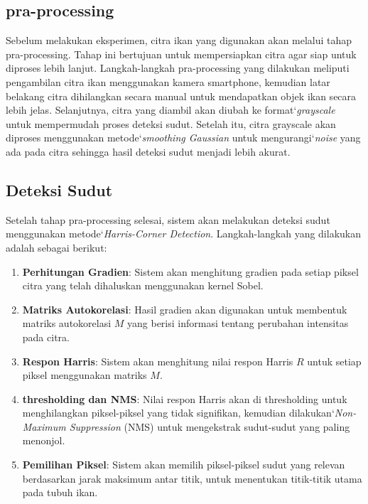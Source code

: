 \subsection{pra-processing}
    Sebelum melakukan eksperimen, citra ikan yang digunakan akan melalui tahap pra-processing. 
Tahap ini bertujuan untuk mempersiapkan citra agar siap untuk diproses lebih lanjut. 
Langkah-langkah pra-processing yang dilakukan meliputi pengambilan citra ikan menggunakan kamera smartphone, kemudian latar belakang citra dihilangkan secara manual untuk mendapatkan objek ikan secara lebih jelas. 
Selanjutnya, citra yang diambil akan diubah ke format`\emph{grayscale} untuk mempermudah proses deteksi sudut. 
Setelah itu, citra grayscale akan diproses menggunakan metode`\emph{smoothing Gaussian} untuk mengurangi`\emph{noise} yang ada pada citra sehingga hasil deteksi sudut menjadi lebih akurat.

\subsection{Deteksi Sudut}
    Setelah tahap pra-processing selesai, sistem akan melakukan deteksi sudut menggunakan metode`\emph{Harris-Corner Detection}. Langkah-langkah yang dilakukan adalah sebagai berikut: 
    \begin{enumerate}
            \item \textbf{Perhitungan Gradien}: Sistem akan menghitung gradien pada setiap piksel citra yang telah dihaluskan menggunakan kernel Sobel.
            \item \textbf{Matriks Autokorelasi}: Hasil gradien akan digunakan untuk membentuk matriks autokorelasi \(M\) yang berisi informasi tentang perubahan intensitas pada citra.
            \item \textbf{Respon Harris}: Sistem akan menghitung nilai respon Harris \(R\) untuk setiap piksel menggunakan matriks \(M\).
            \item \textbf{thresholding dan NMS}: Nilai respon Harris akan di thresholding untuk menghilangkan piksel-piksel yang tidak signifikan, kemudian dilakukan`\emph{Non-Maximum Suppression} (NMS) untuk mengekstrak sudut-sudut yang paling menonjol.
            \item \textbf{Pemilihan Piksel}: Sistem akan memilih piksel-piksel sudut yang relevan berdasarkan jarak maksimum antar titik, untuk menentukan titik-titik utama pada tubuh ikan.
        \end{enumerate}

